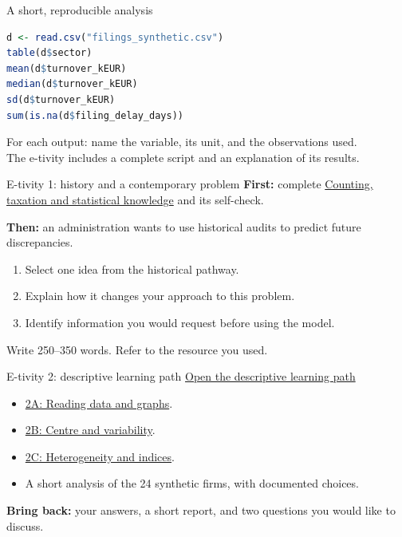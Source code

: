 \begin{frame}[fragile]{A short, reproducible analysis}
\begin{lstlisting}[language=R]
d <- read.csv("filings_synthetic.csv")
table(d$sector)
mean(d$turnover_kEUR)
median(d$turnover_kEUR)
sd(d$turnover_kEUR)
sum(is.na(d$filing_delay_days))
\end{lstlisting}
\par\vspace{3mm}
For each output: name the variable, its unit, and the observations used.\\
The e-tivity includes a complete script and an explanation of its results.
\end{frame}
\begin{frame}{E-tivity 1: history and a contemporary problem}
\textbf{First:} complete \href{https://silviasaliniunimi.github.io/data-analysis-tax-compliance/01-history.html}{Counting, taxation and statistical knowledge} and its self-check.
\par\vspace{2mm}
\textbf{Then:} an administration wants to use historical audits to predict future discrepancies.
\begin{enumerate}
\item Select one idea from the historical pathway.
\item Explain how it changes your approach to this problem.
\item Identify information you would request before using the model.
\end{enumerate}
Write 250--350 words. Refer to the resource you used.
\end{frame}

\begin{frame}{E-tivity 2: descriptive learning path}
\href{https://silviasaliniunimi.github.io/data-analysis-tax-compliance/02-descriptive.html}{Open the descriptive learning path}\par
\begin{itemize}
\item \href{https://silviasaliniunimi.github.io/data-analysis-tax-compliance/02a-graphs.html}{2A: Reading data and graphs}.
\item \href{https://silviasaliniunimi.github.io/data-analysis-tax-compliance/02b-centre-spread.html}{2B: Centre and variability}.
\item \href{https://silviasaliniunimi.github.io/data-analysis-tax-compliance/02c-heterogeneity.html}{2C: Heterogeneity and indices}.
\item A short analysis of the 24 synthetic firms, with documented choices.
\end{itemize}\par\vspace{2mm}\textbf{Bring back:} your answers, a short report, and two questions you would like to discuss.
\end{frame}

